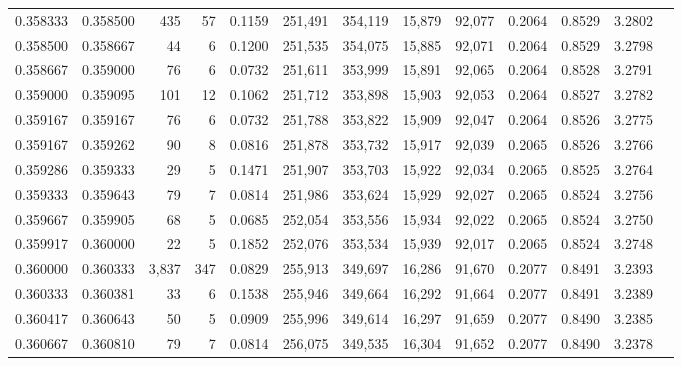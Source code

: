 \begin{tabular}{rrrrrrrrrrrrr}
0.358333 & 0.358500 &   435 &  57 &                                     0.1159 & 251,491 & 354,119 &  15,879 &  92,077 & 0.2064 & 0.8529 & 3.2802 \\
0.358500 & 0.358667 &    44 &   6 &                                     0.1200 & 251,535 & 354,075 &  15,885 &  92,071 & 0.2064 & 0.8529 & 3.2798 \\
0.358667 & 0.359000 &    76 &   6 &                                     0.0732 & 251,611 & 353,999 &  15,891 &  92,065 & 0.2064 & 0.8528 & 3.2791 \\
0.359000 & 0.359095 &   101 &  12 &                                     0.1062 & 251,712 & 353,898 &  15,903 &  92,053 & 0.2064 & 0.8527 & 3.2782 \\
0.359167 & 0.359167 &    76 &   6 &                                     0.0732 & 251,788 & 353,822 &  15,909 &  92,047 & 0.2064 & 0.8526 & 3.2775 \\
0.359167 & 0.359262 &    90 &   8 &                                     0.0816 & 251,878 & 353,732 &  15,917 &  92,039 & 0.2065 & 0.8526 & 3.2766 \\
0.359286 & 0.359333 &    29 &   5 &                                     0.1471 & 251,907 & 353,703 &  15,922 &  92,034 & 0.2065 & 0.8525 & 3.2764 \\
0.359333 & 0.359643 &    79 &   7 &                                     0.0814 & 251,986 & 353,624 &  15,929 &  92,027 & 0.2065 & 0.8524 & 3.2756 \\
0.359667 & 0.359905 &    68 &   5 &                                     0.0685 & 252,054 & 353,556 &  15,934 &  92,022 & 0.2065 & 0.8524 & 3.2750 \\
0.359917 & 0.360000 &    22 &   5 &                                     0.1852 & 252,076 & 353,534 &  15,939 &  92,017 & 0.2065 & 0.8524 & 3.2748 \\
0.360000 & 0.360333 & 3,837 & 347 &                                     0.0829 & 255,913 & 349,697 &  16,286 &  91,670 & 0.2077 & 0.8491 & 3.2393 \\
0.360333 & 0.360381 &    33 &   6 &                                     0.1538 & 255,946 & 349,664 &  16,292 &  91,664 & 0.2077 & 0.8491 & 3.2389 \\
0.360417 & 0.360643 &    50 &   5 &                                     0.0909 & 255,996 & 349,614 &  16,297 &  91,659 & 0.2077 & 0.8490 & 3.2385 \\
0.360667 & 0.360810 &    79 &   7 &                                     0.0814 & 256,075 & 349,535 &  16,304 &  91,652 & 0.2077 & 0.8490 & 3.2378 \\

\end{tabular}
